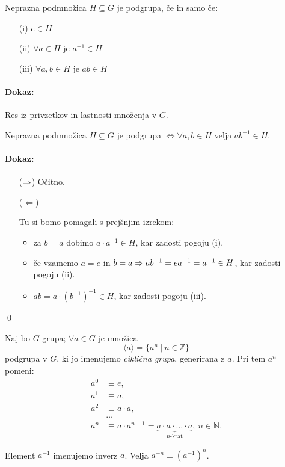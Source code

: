 \begin{trditev}
	Neprazna podmno\v zica $H \subseteq G$ je podgrupa, \v ce in samo \v ce:
	\begin{itemize}
		\item[(i)]{$e \in H$}
		\item[(ii)]{$\forall a \in H$ je $a^{-1} \in H$}
		\item[(iii)]{$\forall a,b \in H$ je $ab \in H$}
	\end{itemize}
\end{trditev}

\paragraph{Dokaz:} Res iz privzetkov in lastnosti mno\v zenja v $G$.

\begin{trditev}
	Neprazna podmno\v zica $H \subseteq G$ je podgrupa $\iff \forall a,b \in H$ velja $ab^{-1} \in H$.
\end{trditev}

\paragraph{Dokaz:}
\begin{itemize}
	\item[($\Rightarrow$)]{ O\v citno.}
	\item[($\Leftarrow$)]{Tu si bomo pomagali s prej\v snjim izrekom:
		\begin{itemize}
			\item{za $b = a$ dobimo $a\cdot a^{-1} \in H$, kar zadosti pogoju (i).}
			\item{\v ce vzamemo $a = e$ in $b = a \Rightarrow ab^{-1} = ea^{-1} = a^{-1} \in H$, kar zadosti pogoju (ii).}
			\item{$ab = a \cdot (b^{-1})^{-1} \in H$, kar zadosti pogoju (iii).}
		\end{itemize}}
\end{itemize}
\qed

\begin{posledica} Naj bo $G$ grupa; $\forall a \in G$ je mno\v zica
\[
	\langle a \rangle = \{a^n\ |\ n\in\mathbb{Z}\}
\]
podgrupa v $G$, ki jo imenujemo \emph{cikli\v cna grupa}, generirana z $a$. Pri tem $a^n$ pomeni:
\begin{align*}
	a^0 &\equiv e, \\
	a^1 &\equiv a, \\
	a^2 &\equiv a\cdot a, \\
	&\ldots \\
	a^n &\equiv a\cdot a^{n-1} = \underbrace{a\cdot a\cdot \ldots \cdot a}_{n\text{-krat}},\ n\in \mathbb{N}.
\end{align*}

\ni Element $a^{-1}$ imenujemo inverz $a$. Velja $a^{-n} \equiv (a^{-1})^n$.
\end{posledica}

